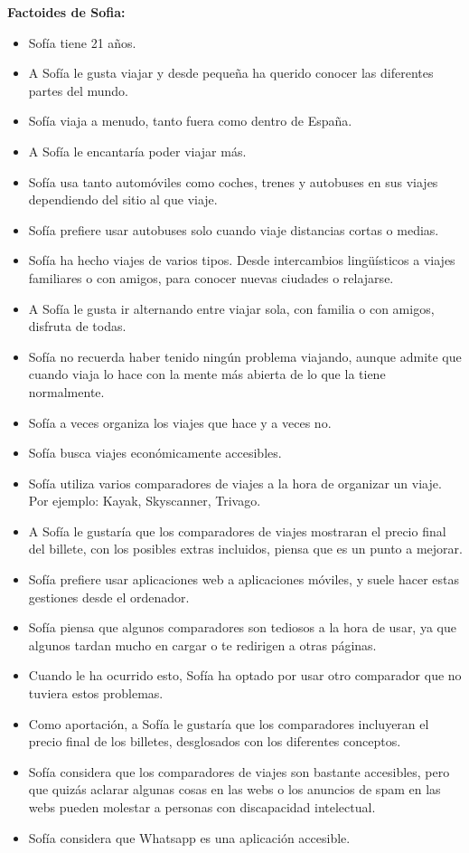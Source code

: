 \textbf{Factoides de Sofia:}

\begin{itemize}
    \item Sofía tiene 21 años.
    \item A Sofía le gusta viajar y desde pequeña ha querido conocer las diferentes partes del mundo.
    \item Sofía viaja a menudo, tanto fuera como dentro de España.
    \item A Sofía le encantaría poder viajar más.
    \item Sofía usa tanto automóviles como coches, trenes y autobuses en sus viajes dependiendo del sitio al que viaje.
    \item Sofía prefiere usar autobuses solo cuando viaje distancias cortas o medias.
    \item Sofía ha hecho viajes de varios tipos. Desde intercambios lingüísticos a viajes familiares o con amigos, para conocer nuevas ciudades o relajarse.
    \item A Sofía le gusta ir alternando entre viajar sola, con familia o con amigos, disfruta de todas.
    \item Sofía no recuerda haber tenido ningún problema viajando, aunque admite que cuando viaja lo hace con la mente más abierta de lo que la tiene normalmente.
    \item Sofía a veces organiza los viajes que hace y a veces no.
    \item Sofía busca viajes económicamente accesibles.
    \item Sofía utiliza varios comparadores de viajes a la hora de organizar un viaje. Por ejemplo: Kayak, Skyscanner, Trivago.
    \item A Sofía le gustaría que los comparadores de viajes mostraran el precio final del billete, con los posibles extras incluidos, piensa que es un punto a mejorar.
    \item Sofía prefiere usar aplicaciones web a aplicaciones móviles, y suele hacer estas gestiones desde el ordenador.
    \item Sofía piensa que algunos comparadores son tediosos a la hora de usar, ya que algunos tardan mucho en cargar o te redirigen a otras páginas.
    \item Cuando le ha ocurrido esto, Sofía ha optado por usar otro comparador que no tuviera estos problemas.
    \item Como aportación, a Sofía le gustaría que los comparadores incluyeran el precio final de los billetes, desglosados con los diferentes conceptos.
    \item Sofía considera que los comparadores de viajes son bastante accesibles, pero que quizás aclarar algunas cosas en las webs o los anuncios de spam en las webs pueden molestar a personas con discapacidad intelectual.
    \item Sofía considera que Whatsapp es una aplicación accesible.
\end{itemize}


